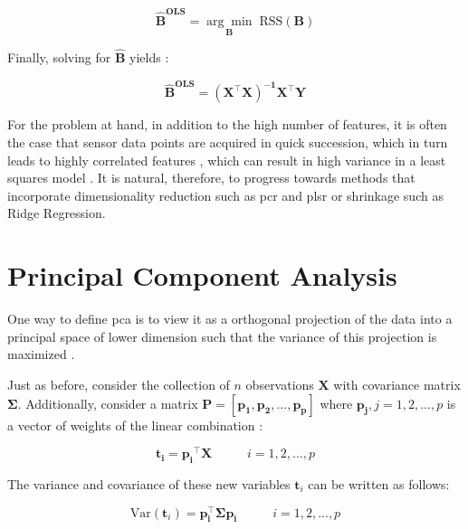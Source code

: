\begin{equation}
	\label{eqn:betahat}
	\mathbf{\hat{B}^\text{OLS}} = \underset{\mathbf{B}}{\arg\min} 	\; \text{RSS}(\mathbf{B})
\end{equation}

Finally, solving for $\mathbf{\hat{B}}$ yields \parencite{friedman2001}:

\begin{equation}
	\label{eqn:ols_beta}
	\mathbf{\hat{B}^\text{OLS}} = \mathbf{(X^\intercal X)^{-1} X^\intercal Y}
\end{equation}

For the problem at hand, in addition to the high number of features, it is often the case that sensor data points are acquired in quick succession, which in turn leads to highly correlated features \parencite{Bastuck_2019}, which can result in high variance in a least squares model \parencite{friedman2001}. It is natural, therefore, to progress towards methods that incorporate dimensionality reduction such as \acrfull{pcr} and \acrfull{plsr} or shrinkage such as Ridge Regression.

\section{Principal Component Analysis}
\label{sec:pca}

One way to define \acrfull{pca} is to view it as a orthogonal projection of the data into a principal space of lower dimension such that the variance of this projection is maximized \parencite{bishop2006pattern}.

Just as before, consider the  collection of $n$ observations  $\mathbf{X}$ with covariance matrix $\mathbf{\Sigma}$. Additionally, consider a matrix $\mathbf{P = [p_1, p_2, ..., p_p]}$ where $\mathbf{p_j}, j=1,2,...,p$ is a vector of weights of the linear combination \parencite{johnson2013applied}:

\begin{equation}
	\label{eqn:pca-lincomb}
	\mathbf{t_i}=\mathbf{p_i}^\intercal \mathbf{X} \;\;\;\;\;\;\;\;\;\; i = 1, 2, ..., p
\end{equation}

The variance and covariance of these new variables $\mathbf{t}_i$ can be written as follows:

\begin{equation}
	\label{eqn:pca-var}
	\text{Var}(\mathbf{t}_i) = \mathbf{p_i^\intercal \Sigma p_i} \;\;\;\;\;\;\;\;\;\; i = 1, 2, ..., p
\end{equation}

